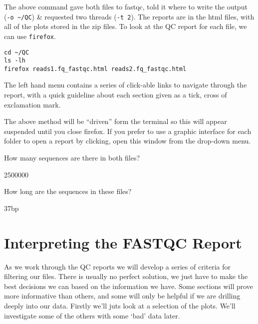 \begin{steps}
The above command gave both files to fastqc, told it where to write the output (\texttt{-o \~{}/QC}) \& requested two threads (\texttt{-t 2}). 
The reports are in the html files, with all of the plots stored in the zip files. 
To look at the QC report for each file, we can use \texttt{firefox}.
\begin{lstlisting}
cd ~/QC
ls -lh
firefox reads1.fq_fastqc.html reads2.fq_fastqc.html
\end{lstlisting}
The left hand menu contains a series of click-able links to navigate through the report, with a quick guideline about each section given as a tick, cross of exclamation mark.
\end{steps}

\begin{information}
The above method will be ``driven'' form the terminal so this will appear suspended until you close firefox.
If you prefer to use a graphic interface for each folder to open a report by clicking, open this window from the drop-down menu.
\end{information}

\begin{questions}
How many sequences are there in both files?\\
\begin{answer}
  2500000 \\
\end{answer}
How long are the sequences in these files?\\
\begin{answer}
  37bp \\
\end{answer}
\end{questions}

\section{Interpreting the FASTQC Report}
\begin{note}
As we work through the QC reports we will develop a series of criteria for filtering our files.
There is usually no perfect solution, we just have to make the best decisions we can based on the information we have.
Some sections will prove more informative than others, and some will only be helpful if we are drilling deeply into our data.
Firstly we'll juts look at a selection of the plots.
We'll investigate some of the others with some `bad' data later.
\end{note}

